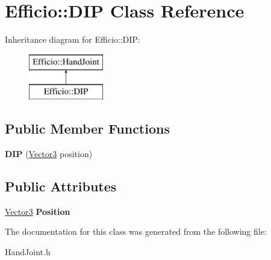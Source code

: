 \hypertarget{class_efficio_1_1_d_i_p}{}\section{Efficio\+:\+:D\+IP Class Reference}
\label{class_efficio_1_1_d_i_p}
Inheritance diagram for Efficio\+:\+:D\+IP\+:\begin{figure}[H]
\begin{center}
\leavevmode
\includegraphics[height=2.000000cm]{class_efficio_1_1_d_i_p}
\end{center}
\end{figure}
\subsection*{Public Member Functions}
\begin{DoxyCompactItemize}
\item 
\hypertarget{class_efficio_1_1_d_i_p_a75b38a33774d216c9ba69a5cd66e3b41}{}\label{class_efficio_1_1_d_i_p_a75b38a33774d216c9ba69a5cd66e3b41} 
{\bfseries D\+IP} (\hyperlink{class_efficio_1_1_vector3}{Vector3} position)
\end{DoxyCompactItemize}
\subsection*{Public Attributes}
\begin{DoxyCompactItemize}
\item 
\hypertarget{class_efficio_1_1_d_i_p_a9d86982fe4f209e4bfe26badf3e6d33f}{}\label{class_efficio_1_1_d_i_p_a9d86982fe4f209e4bfe26badf3e6d33f} 
\hyperlink{class_efficio_1_1_vector3}{Vector3} {\bfseries Position}
\end{DoxyCompactItemize}


The documentation for this class was generated from the following file\+:\begin{DoxyCompactItemize}
\item 
Hand\+Joint.\+h\end{DoxyCompactItemize}

